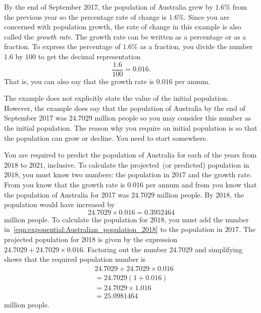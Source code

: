 \documentclass[a4paper,oneside,12pt]{article}
\begin{document}
\begin{solution}
By the end of September 2017, the population of Australia grew by
$1.6\%$ from the previous year so the percentage rate of change is
$1.6\%$.  Since you are concerned with population growth, the rate of
change in this example is also called the \emph{growth rate}.  The
growth rate can be written as a percentage or as a fraction.  To
express the percentage of $1.6\%$ as a fraction, you divide the number
$1.6$ by $100$ to get the decimal representation
\[
\frac{1.6}{100}
=
0.016.
\]
That is, you can also say that the growth rate is $0.016$ per annum.

The example does not explicitly state the value of the initial
population.  However, the example does say that the population of
Australia by the end of September 2017 was $24.7029$ million people so
you may consider this number as the initial population.  The reason
why you require an initial population is so that the population can
grow or decline.  You need to start somewhere.

You are required to predict the population of Australia for each of
the years from $2018$ to $2021$, inclusive.  To calculate the
projected~(or predicted) population in $2018$, you must know two
numbers: the population in $2017$ and the growth rate.
From 
you know that the growth rate is $0.016$ per annum and
from 
you know that the population of Australia for 2017 was $24.7029$
million people.  By $2018$, the population would have increased by
\begin{equation}
\label{eqn:exponential:Australian_population_2018}
24.7029 \times 0.016
=
0.3952464
\end{equation}
million people.  To calculate the population for $2018$, you must add
the number in~\eqref{eqn:exponential:Australian_population_2018} to
the population in $2017$.  The projected population for $2018$ is
given by the expression $24.7029 + 24.7029 \times 0.016$.  Factoring
out the number $24.7029$ and simplifying shows that the required
population number is
\begin{equation}
\label{eqn:exponential:Australian_population_2018_calculation}
\begin{aligned}
&24.7029 + 24.7029 \times 0.016 \\[4pt]
&=
24.7029 (1 + 0.016) \\[4pt]
&=
24.7029 \times 1.016 \\[4pt]
&=
25.0981464
\end{aligned}
\end{equation}
million people.


\end{solution}
\end{document}
